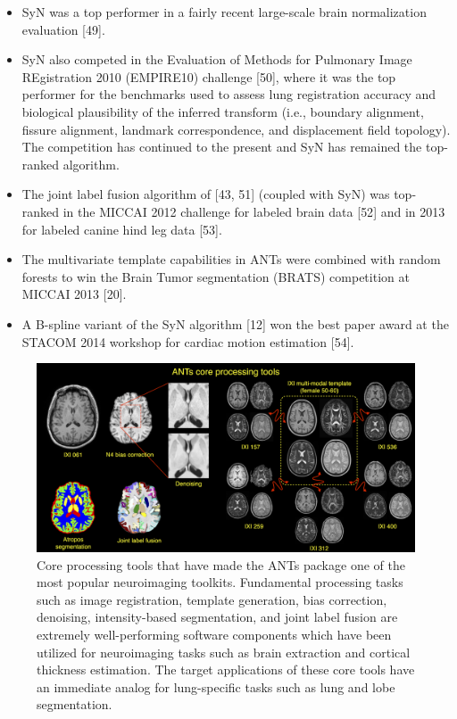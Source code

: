 \documentclass[11pt,]{article}
\providecommand{\tightlist}{%
  \setlength{\itemsep}{0pt}\setlength{\parskip}{0pt}}
\begin{document}
\begin{itemize}
\tightlist
\item
  SyN was a top performer in a fairly recent large-scale brain
  normalization evaluation {[}49{]}.
\item
  SyN also competed in the Evaluation of Methods for Pulmonary Image
  REgistration 2010 (EMPIRE10) challenge {[}50{]}, where it was the top
  performer for the benchmarks used to assess lung registration accuracy
  and biological plausibility of the inferred transform (i.e., boundary
  alignment, fissure alignment, landmark correspondence, and
  displacement field topology). The competition has continued to the
  present and SyN has remained the top-ranked algorithm.
\item
  The joint label fusion algorithm of {[}43, 51{]} (coupled with SyN)
  was top-ranked in the MICCAI 2012 challenge for labeled brain data
  {[}52{]} and in 2013 for labeled canine hind leg data {[}53{]}.
\item
  The multivariate template capabilities in ANTs were combined with
  random forests to win the Brain Tumor segmentation (BRATS) competition
  at MICCAI 2013 {[}20{]}.
\item
  A B-spline variant of the SyN algorithm {[}12{]} won the best paper
  award at the STACOM 2014 workshop for cardiac motion estimation
  {[}54{]}.
\end{itemize}

\begin{figure}[htbp]
\centering
\includegraphics{Figs/coreANtsToolsNeuro.png}
\caption{Core processing tools that have made the ANTs package one of
the most popular neuroimaging toolkits. Fundamental processing tasks
such as image registration, template generation, bias correction,
denoising, intensity-based segmentation, and joint label fusion are
extremely well-performing software components which have been utilized
for neuroimaging tasks such as brain extraction and cortical thickness
estimation. The target applications of these core tools have an
immediate analog for lung-specific tasks such as lung and lobe
segmentation.}
\end{figure}
\end{document}
